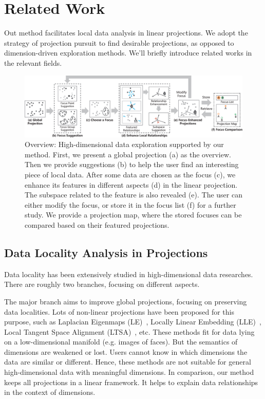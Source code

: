 \section{Related Work}
\label{section:relatedwork}
Out method facilitates local data analysis in linear projections. We adopt the strategy of projection pursuit to find desirable projections, as opposed to dimension-driven exploration methods. We'll briefly introduce related works in the relevant fields.

\begin{figure}[htbp]
\centering
  \includegraphics[width=1\linewidth]{images/new_pipeline.eps}%
  \caption{Overview: High-dimensional data exploration supported by our method. First, we present a global projection (a) as the overview. Then we provide suggestions (b) to help the user find an interesting piece of local data. After some data are chosen as the focus (c), we enhance its features in different aspects (d) in the linear projection. The subspace related to the feature is also revealed (e). The user can either modify the focus, or store it in the focus list (f) for a further study. We provide a projection map, where the stored  focuses can be compared based on their featured projections.}
\label{fig:workflow}
  \end{figure}

\subsection{Data Locality Analysis in Projections}
Data locality has been extensively studied in high-dimensional data researches. There are roughly two branches, focusing on different aspects.

The major branch aims to improve global projections, focusing on preserving data localities. Lots of non-linear projections have been proposed for this purpose, such as Laplacian Eigenmaps (LE)~\cite{DBLP:journals/neco/BelkinN03}, Locally Linear Embedding (LLE)~\cite{roweis2000nonlinear}, Local Tangent Space Alignment (LTSA)~\cite{DBLP:journals/corr/cs-LG-0212008}, etc. These methods fit for data lying on a low-dimensional manifold (e.g. images of faces). But the semantics of dimensions are weakened or lost. Users cannot know in which dimensions the data are similar or different. Hence, these methods are not suitable for general high-dimensional data with meaningful dimensions. In comparison, our method keeps all projections in a linear framework. It helps to explain data relationships in the context of dimensions.

